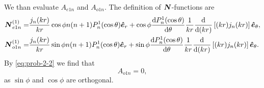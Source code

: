 \documentclass[hyperref, a4paper]{article}
\begin{document}
We than evaluate $A_{e1n}$ and $A_{o1n}$. The definition of $\vb*{N}$-functions are
\begin{equation}
    \begin{aligned}
        \boldsymbol{N}^{(1)}_{e 1 n}=& \frac{j_{n}(k r)}{k r} \cos \phi n(n+1) P_{n}^{1}(\cos \theta) \vu*{e}_{r} +\cos \phi \frac{\mathrm{d} P_{n}^{1}(\cos \theta)}{\mathrm{d} \theta} \frac{1}{k r} \frac{\mathrm{d}}{\mathrm{d}(k r)}\left[(k r) j_{n}(k r)\right] \vu*{e}_{\theta} , \\
        \boldsymbol{N}^{(1)}_{o 1 n}=& \frac{j_{n}(k r)}{k r} \sin \phi n(n+1) P_{n}^{1}(\cos \theta) \vu*{e}_{r} +\sin \phi \frac{\mathrm{d} P_{n}^{1}(\cos \theta)}{\mathrm{d} \theta} \frac{1}{k r} \frac{\mathrm{d}}{\mathrm{d}(k r)}\left[(k r) j_{n}(k r)\right] \vu*{e}_{\theta} .
        \end{aligned}
\end{equation}
By \eqref{eq:prob-2-2} we find that 
\begin{equation}
    A_{o1n} = 0,
\end{equation}
as $\sin \phi$ and $\cos \phi$ are orthogonal.
\end{document}

